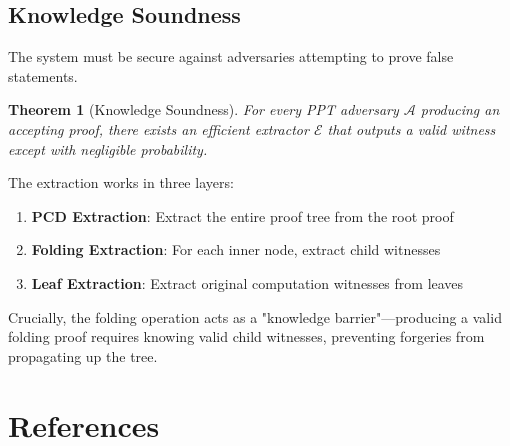 \documentclass[11pt,a4paper]{article}
\theoremstyle{plain}
\newtheorem{theorem}{Theorem}[section]
\theoremstyle{definition}
\begin{document}
\subsection{Knowledge Soundness}

The system must be secure against adversaries attempting to prove false statements.

\begin{theorem}[Knowledge Soundness]
For every PPT adversary $\mathcal{A}$ producing an accepting proof, there exists an efficient extractor $\mathcal{E}$ that outputs a valid witness except with negligible probability.
\end{theorem}

The extraction works in three layers:
\begin{enumerate}
\item \textbf{PCD Extraction}: Extract the entire proof tree from the root proof
\item \textbf{Folding Extraction}: For each inner node, extract child witnesses
\item \textbf{Leaf Extraction}: Extract original computation witnesses from leaves
\end{enumerate}

Crucially, the folding operation acts as a "knowledge barrier"—producing a valid folding proof requires knowing valid child witnesses, preventing forgeries from propagating up the tree.

\section{References}
\end{document}
